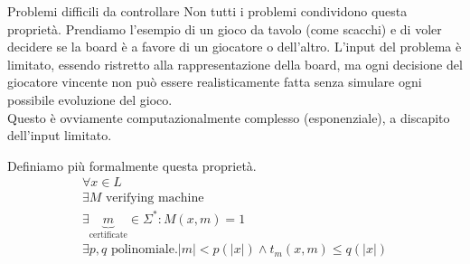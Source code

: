 \documentclass{article}
\begin{document}
\begin{callout}{Problemi difficili da controllare}
    Non tutti i problemi condividono questa proprietà. Prendiamo l'esempio di un gioco da tavolo (come scacchi) e di voler decidere se la board è a favore di un giocatore o dell'altro. L'input del problema è limitato, essendo ristretto alla rappresentazione della board, ma ogni decisione del giocatore vincente non può essere realisticamente fatta senza simulare ogni possibile evoluzione del gioco.\\
    Questo è ovviamente computazionalmente complesso (esponenziale), a discapito dell'input limitato.
\end{callout}

Definiamo più formalmente questa proprietà.
\begin{gather*}
    \forall x \in L \\
    \exists M\text{ verifying machine} \\
    \exists \underbrace{m}_\text{certificate} \in \Sigma^*: M(x,m) = 1 \\
    \exists p,q\text{ polinomiale}. |m|<p(|x|) \wedge t_m(x,m)\leq q(|x|)
\end{gather*}
\end{document}

